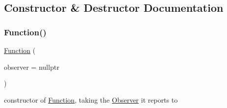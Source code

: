 \subsection{Constructor \& Destructor Documentation}
\mbox{\label{class_s_m_spp__di__unipi__it_1_1_function_ac37e74c32010429773a4e75a33a0928b}} 
\subsubsection{\texorpdfstring{Function()}{Function()}\hspace{0.1cm}{\footnotesize\ttfamily [1/2]}}
{\footnotesize\ttfamily \mbox{\hyperlink{class_s_m_spp__di__unipi__it_1_1_function}{Function}} (\begin{DoxyParamCaption}\item[{\mbox{\hyperlink{class_s_m_spp__di__unipi__it_1_1_observer}{Observer}} $\ast$const}]{observer = {\ttfamily nullptr} }\end{DoxyParamCaption})\hspace{0.3cm}{\ttfamily [inline]}}



constructor of \mbox{\hyperlink{class_s_m_spp__di__unipi__it_1_1_function}{Function}}, taking the \mbox{\hyperlink{class_s_m_spp__di__unipi__it_1_1_observer}{Observer}} it reports to 

